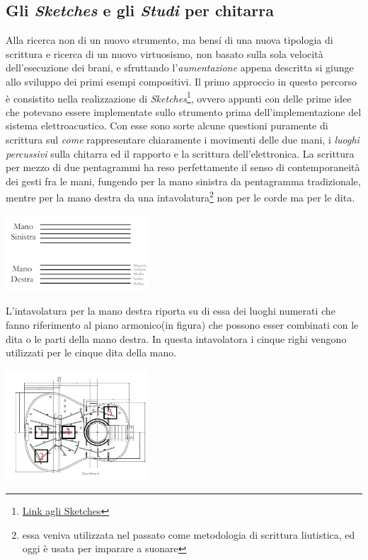\documentclass[oneside]{article}
\begin{document}
\begin{multicols*}{2}
\section{ Gli \textit{Sketches} e gli \textit{Studi} per chitarra}
\noindent

Alla ricerca non di un nuovo strumento, ma bensí di una nuova tipologia di scrittura e ricerca di un nuovo virtuosismo, non basato sulla sola velocità dell’esecuzione dei brani, e  sfruttando l'\textit{aumentazione} appena descritta si giunge allo sviluppo dei primi esempi compositivi.
Il primo approccio in questo percorso è consistito nella realizzazione di \textit{Sketches}\footnote{\href{https://github.com/SMERM/BN-Tedesco/blob/master/COME-02/Lezioni_in_Compresenza/20200324/Sketches.pdf}{Link agli Sketches}}, ovvero appunti con delle prime idee che potevano essere implementate sullo strumento prima dell'implementazione del sistema elettroacustico. Con esse sono sorte alcune questioni puramente di scrittura sul \textit{come} rappresentare chiaramente i movimenti delle due mani, i \textit{luoghi percussivi} sulla chitarra ed il rapporto e la scrittura dell'elettronica.
La scrittura per mezzo di due pentagrammi ha reso perfettamente il senso di contemporaneità dei gesti fra le mani, fungendo per la mano sinistra da pentagramma tradizionale, mentre per la mano destra da una intavolatura\footnote{essa veniva utilizzata nel passato come metodologia di scrittura liutistica, ed oggi è usata per imparare a suonare} non per le corde ma per le dita. 

\includegraphics[width=0.4\textwidth]{img/legenda.png}

L'intavolatura per la mano destra riporta su di essa dei luoghi numerati che fanno riferimento al piano armonico(in figura) che possono esser combinati con le dita o le parti della mano destra. In questa intavolatora i cinque righi vengono utilizzati per le cinque dita della mano. 

\includegraphics[width=0.4\textwidth]{img/luoghi_perc.png}


\end{multicols*}
\end{document}
